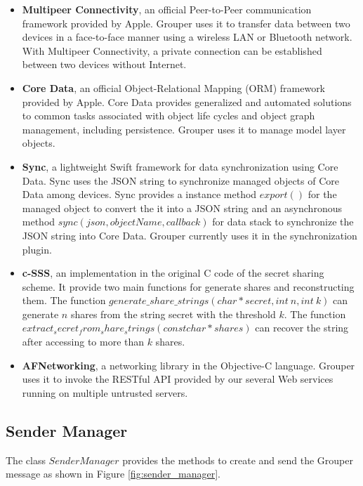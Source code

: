 \documentclass[a4paper,11pt]{report}
\begin{document}
\begin{itemize}[leftmargin=7mm]
	\setlength{\itemsep}{1pt}
	\setlength{\parskip}{0pt}
	\setlength{\parsep}{0pt}
	\item 
	\textbf{Multipeer Connectivity}\cite{mc}, an official Peer-to-Peer communication framework provided by Apple. 
	Grouper uses it to transfer data between two devices in a face-to-face manner using a wireless LAN or Bluetooth network.
	With Multipeer Connectivity, a private connection can be established between two devices without Internet.
	\item 
	\textbf{Core Data}\cite{coredata}, an official Object-Relational Mapping (ORM) framework provided by Apple.
	Core Data provides generalized and automated solutions to common tasks associated with object life cycles and object graph management, including persistence. 
	Grouper uses it to manage model layer objects. 
	\item 
	\textbf{Sync}\cite{sync}, a lightweight Swift framework for data synchronization using Core Data.
	Sync uses the JSON string to synchronize managed objects of Core Data among devices.
	Sync provides a instance method $export()$ for the managed object to convert the it into a JSON string and an asynchronous method $sync(json, objectName, callback)$ for data stack to synchronize the JSON string into Core Data.
	Grouper currently uses it in the synchronization plugin.
	\item 
	\textbf{c-SSS}\cite{c-sss}, an implementation in the original C code of the secret sharing scheme. 
	It provide two main functions for generate shares and reconstructing them. The function $generate\_share\_strings(char * secret, int\ n, int\ k)$ can generate $n$ shares from the string secret with the threshold $k$. The function $extract_secret_from_share_strings(const char * shares)$ can recover the string after accessing to more than $k$ shares.
	\item 
	\textbf{AFNetworking}\cite{afnetworking}, a networking library in the Objective-C language. 
	Grouper uses it to invoke the RESTful API provided by our several Web services running on multiple untrusted servers. 
\end{itemize}

\subsection{Sender Manager} \label{subsection:sender_manager}

The class $SenderManager$ provides the methods to create and send the Grouper message as shown in Figure \ref{fig:sender_manager}.
\end{document}
